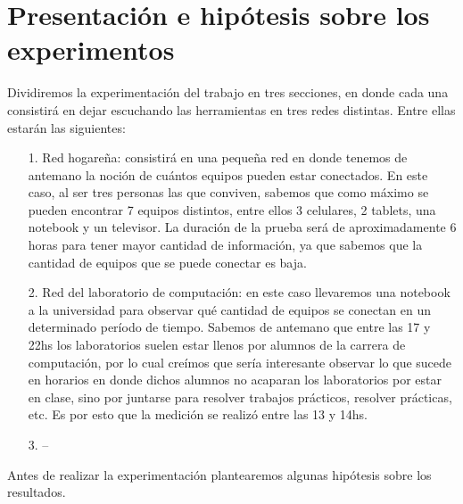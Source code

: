 \section{Presentaci\'on e hip\'otesis sobre los experimentos}

Dividiremos la experimentaci\'on del trabajo en tres secciones, en donde cada una consistir\'a en dejar escuchando las herramientas en tres redes distintas. Entre ellas estar\'an las siguientes:

\begin{itemize}
\item[1.] Red hogare\~na: consistir\'a en una peque\~na red en donde tenemos de antemano la noci\'on de cu\'antos equipos pueden estar conectados. En este caso, al ser tres personas las que conviven, sabemos que como m\'aximo se pueden encontrar 7 equipos distintos, entre ellos 3 celulares, 2 tablets, una notebook y un televisor. La duraci\'on de la prueba ser\'a de aproximadamente 6 horas para tener mayor cantidad de informaci\'on, ya que sabemos que la cantidad de equipos que se puede conectar es baja.
\item[2.] Red del laboratorio de computaci\'on: en este caso llevaremos una notebook a la universidad para observar qu\'e cantidad de equipos se conectan en un determinado per\'iodo de tiempo. Sabemos de antemano que entre las 17 y 22hs los laboratorios suelen estar llenos por alumnos de la carrera de computaci\'on, por lo cual cre\'imos que ser\'ia interesante observar lo que sucede en horarios en donde dichos alumnos no acaparan los laboratorios por estar en clase, sino por juntarse para resolver trabajos pr\'acticos, resolver pr\'acticas, etc. Es por esto que la medici\'on se realiz\'o entre las 13 y 14hs.
\item[3.] --
\end{itemize}


Antes de realizar la experimentaci\'on plantearemos algunas hip\'otesis sobre los resultados.

